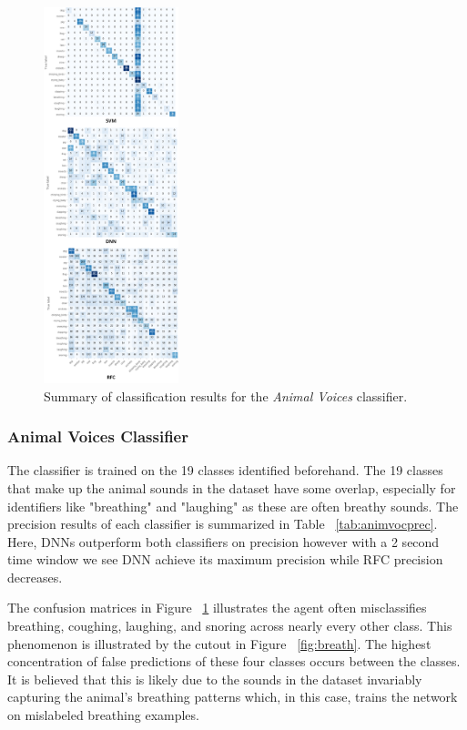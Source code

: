 \begin{figure}[b]
    \includegraphics[width=0.35\textwidth]{figures/Animal_Classification_Comparison.png}
    \caption{Summary of classification results for the \textit{Animal Voices} classifier.}
    \label{fig:AnimClass}
\end{figure}

\subsubsection{Animal Voices Classifier}

The classifier is trained on the 19 classes identified beforehand. The 19 classes that make up the animal sounds in the dataset have some overlap, especially for identifiers like "breathing" and "laughing" as these are often breathy sounds. The precision results of each classifier is summarized in Table ~\ref{tab:animvocprec}. Here, DNNs outperform both classifiers on precision however with a 2 second time window we see DNN achieve its maximum precision while RFC precision decreases.

The confusion matrices in Figure ~\ref{fig:AnimClass} illustrates the agent often misclassifies breathing, coughing, laughing, and snoring across nearly every other class. This phenomenon is illustrated by the cutout in Figure ~\ref{fig:breath}. The highest concentration of false predictions of these four classes occurs between the classes. It is believed that this is likely due to the sounds in the dataset invariably capturing the animal's breathing patterns which, in this case, trains the network on mislabeled breathing examples.

